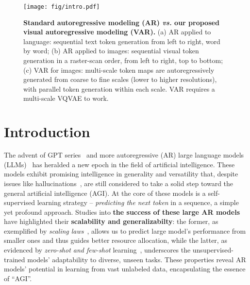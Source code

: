 \begin{figure}[ht]
\begin{center}
\texttt{[image: fig/intro.pdf]}
\end{center}
\vspace{-9pt}
\caption{\small
\textbf{Standard autoregressive modeling (AR) \textit{vs.} our proposed visual autoregressive modeling (VAR).}
(a) AR applied to language: sequential text token generation from left to right, word by word;
(b) AR applied to images: sequential visual token generation in a raster-scan order, from left to right, top to bottom;
(c) VAR for images: multi-scale token maps are autoregressively generated from coarse to fine scales (lower to higher resolutions), with parallel token generation within each scale. VAR requires a multi-scale VQVAE to work.
\vspace{-12pt}
}
\label{fig:intro}
\end{figure}

\vspace{-2pt}
\section{Introduction} \label{sec:intro}
\vspace{-4pt}
The advent of GPT series~\cite{gpt1,gpt2,gpt3,gpt3.5,gpt4} and more autoregressive (AR) large language models (LLMs)~\cite{palm,palm2,chinchilla,llama1,llama2,bloom,ernie3,qwen,team2023gemini} has heralded a new epoch in the field of artificial intelligence.
These models exhibit promising intelligence in generality and versatility that, despite issues like hallucinations~\cite{hallucination}, are still considered to take a solid step toward the general artificial intelligence (AGI).
At the core of these models is a self-supervised learning strategy -- \textit{predicting the next token} in a sequence, a simple yet profound approach.
Studies into \textbf{the success of these large AR models} have highlighted their \textbf{scalability and generalizabilty}:
the former, as exemplified by \textit{scaling laws}~\cite{scalinglaw,scalingar}, allows us to predict large model's performance from smaller ones and thus guides better resource allocation, while the latter, as evidenced by \textit{zero-shot and few-shot} learning~\cite{gpt2,gpt3}, underscores the unsupervised-trained models' adaptability to diverse, unseen tasks. These properties reveal AR models' potential in learning from vast unlabeled data, encapsulating the  essence of ``AGI''.

